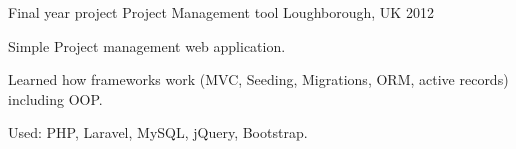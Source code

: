 \begin{cventries}
  \cventry
    {Final year project} %
    {Project Management tool} %
    {Loughborough, UK} %
    {2012} %
    {
      \begin{cvitems} %
        \item {Simple Project management web application.}
        \item {Learned how frameworks work (MVC, Seeding, Migrations, ORM, active records) including OOP.}
        \item {Used: PHP, Laravel, MySQL, jQuery, Bootstrap.}
      \end{cvitems}
    }
\end{cventries}

